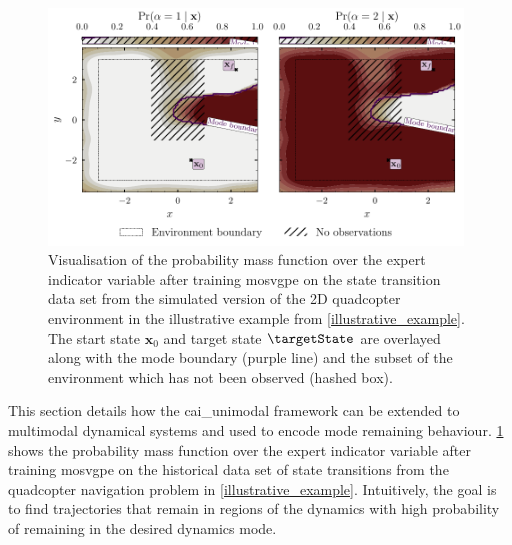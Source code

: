 \documentclass{mimosis-class/mimosis}
\numberwithin{equation}{chapter}
\newcommand{\state}{\ensuremath{\mathbf{x}}}
\begin{document}
{\renewcommand{\transitionVarDistK}{\ensuremath{q(\state_{\timeInd+1} \mid \state_0, \modeVarTraj_{0:\timeInd})}}
\begin{figure}[h!]
\centering
\includegraphics[width=0.98\textwidth]{./images/mode-opt/env/scenario_7/mosvgpe/mixing_probs_no_obs.pdf}
\caption[\acrshort{mosvgpe}'s mixing probabilities after training on simulated quadcopter data set from Environment 1]{
Visualisation of the probability mass function over the expert indicator variable after training \acrshort{mosvgpe}
on the state transition data set from the simulated version of the 2D quadcopter environment
in the illustrative example from \cref{illustrative_example}.
The start state $\state_0$ and target state $\targetState$ are overlayed along with the mode boundary (purple line)
and the subset of the environment which has not been observed (hashed box).}
\label{eq-traj-opt-gating-network-prob-post-inf}
\end{figure}
This section details how the \acrfull{cai_unimodal} framework can be extended to multimodal dynamical systems and
used to encode mode remaining behaviour.
\cref{eq-traj-opt-gating-network-prob-post-inf} shows the probability mass function over the expert indicator variable
after training \acrshort{mosvgpe} on the historical data set of state transitions from the
quadcopter navigation problem in \cref{illustrative_example}.
Intuitively, the goal is to find trajectories that remain in regions of the dynamics with high probability of
remaining in the desired dynamics mode.

\begin{figure}[t!]
  \centering
   \resizebox{0.4\textwidth}{!}{
    \begin{tikzpicture}[
      pre/.style={<-,shorten <=0.4pt,>=stealth',semithick},
      post/.style={->,shorten >=0.4pt,>=stealth',semithick}
      ]
      \node[obs] (x1) {$\state_0$};
      \node[latent, right=of x1] (x2) {$\state_1$};
      \node[latent, right=of x2] (x3) {$\state_2$};
      \node[latent, right=of x3] (x4) {$\state_3$};


\end{tikzpicture}}
\end{figure}}
\end{document}
